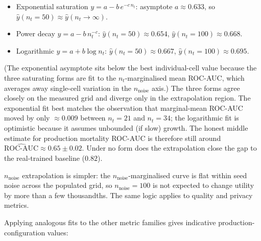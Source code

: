 \begin{itemize}
    \item Exponential saturation $y = a - b\,e^{-c\,n_t}$: asymptote $a \approx 0.633$, so $\hat{y}(n_t{=}50) \approx \hat{y}(n_t{\to}\infty)$.
    \item Power decay $y = a - b\,n_t^{-c}$: $\hat{y}(n_t{=}50) \approx 0.654$, $\hat{y}(n_t{=}100) \approx 0.668$.
    \item Logarithmic $y = a + b\log n_t$: $\hat{y}(n_t{=}50) \approx 0.667$, $\hat{y}(n_t{=}100) \approx 0.695$.
\end{itemize}

(The exponential asymptote sits below the best individual-cell value because the three saturating forms are fit to the $n_t$-marginalised mean ROC-AUC, which averages away single-cell variation in the $n_{\text{noise}}$ axis.) The three forms agree closely on the measured grid and diverge only in the extrapolation region. The exponential fit best matches the observation that marginal-mean ROC-AUC moved by only $\approx 0.009$ between $n_t{=}21$ and $n_t{=}34$; the logarithmic fit is optimistic because it assumes unbounded (if slow) growth. The honest middle estimate for production mortality ROC-AUC is therefore still around $\hat{\text{ROC-AUC}} \approx 0.65 \pm 0.02$. Under no form does the extrapolation close the gap to the real-trained baseline ($0.82$).

$n_{\text{noise}}$ extrapolation is simpler: the $n_{\text{noise}}$-marginalised curve is flat within seed noise across the populated grid, so $n_{\text{noise}}{=}100$ is not expected to change utility by more than a few thousandths. The same logic applies to quality and privacy metrics.

Applying analogous fits to the other metric families gives indicative production-configuration values:

